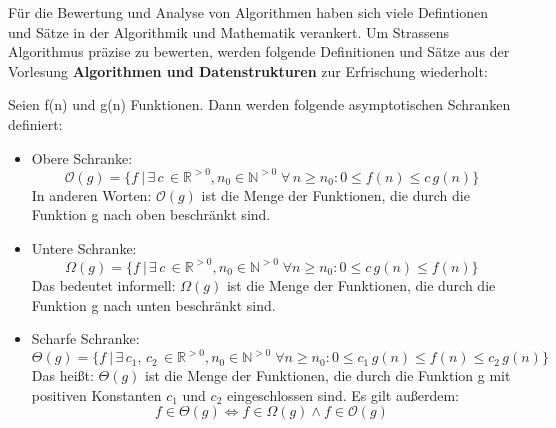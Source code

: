Für die Bewertung und Analyse von Algorithmen haben sich viele Defintionen und Sätze in der Algorithmik und Mathematik verankert.
Um Strassens Algorithmus präzise zu bewerten, werden folgende Definitionen und Sätze aus der Vorlesung \textbf{Algorithmen und Datenstrukturen} zur Erfrischung wiederholt:
\begin{env_definition}
    Seien f(n) und g(n) Funktionen.
    Dann werden folgende asymptotischen Schranken definiert:
    \begin{itemize}
        \item Obere Schranke:
        \[
            \mathcal{O}(g) = \{f\ |\,\exists\,c\,\in \mathbb{R}^{> 0}, n_0 \in \mathbb{N}^{> 0}\; \forall \,n \geq n_0: 0 \leq f(n) \leq c\,g(n)\}
        \]
        In anderen Worten: $\mathcal{O}(g)$ ist die Menge der Funktionen, die durch die Funktion g nach oben beschränkt sind.
        \item Untere Schranke:
        \[
            \Omega(g) = \{f\ |\, \exists\,c\,\in \mathbb{R}^{> 0}, n_0 \in \mathbb{N}^{> 0}\; \forall n \geq n_0: 0 \leq c\,g(n) \leq f(n) \}
        \]
        Das bedeutet informell: $\Omega(g)$ ist die Menge der Funktionen, die durch die Funktion g nach unten beschränkt sind.
        \item Scharfe Schranke:
        \[
            \Theta(g) = \{f\ |\, \exists\,c_1,\,c_2\,\in \mathbb{R}^{> 0}, n_0 \in \mathbb{N}^{> 0}\; \forall n \geq n_0: 0 \leq c_1\,g(n) \leq f(n) \leq c_2\,g(n)\}
        \]
        Das heißt: $\Theta(g)$ ist die Menge der Funktionen, die durch die Funktion g mit positiven Konstanten $c_1$ und $c_2$ eingeschlossen sind.
        Es gilt außerdem:
        \[
            f \in \Theta(g) \iff f \in \Omega(g) \land f \in \mathcal{O}(g)
        \]
    \end{itemize}
\end{env_definition}

